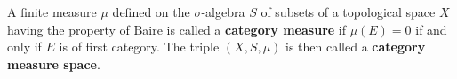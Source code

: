 A finite measure $\mu$ defined on the $\sigma$-algebra $S$ of subsets of a topological space $X$ having the property of Baire is called a \textbf{category measure} if $\mu(E) = 0$ if and only if $E$ is of first category. The triple $(X, S, \mu)$ is then called a \textbf{category measure space}.

